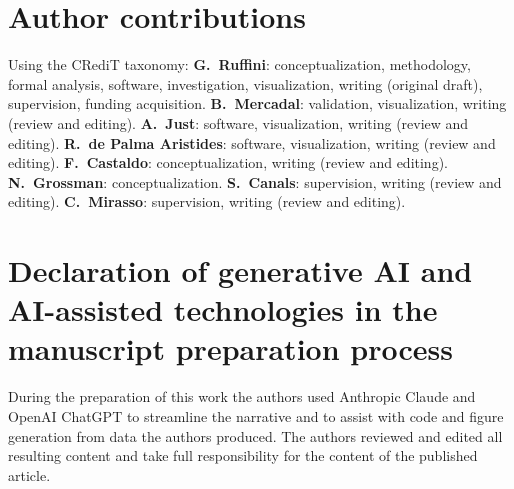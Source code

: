 \documentclass[11pt,a4paper]{article}
\newif\ifappendices
\begin{document}
\section*{Author contributions}
Using the CRediT taxonomy: \textbf{G.~Ruffini}: conceptualization, methodology, formal
analysis, software, investigation, visualization, writing (original draft), supervision,
funding acquisition. \textbf{B.~Mercadal}: validation, visualization, writing (review
and editing). \textbf{A.~Just}: software, visualization, writing (review and editing).
\textbf{R.~de Palma Aristides}: software, visualization, writing (review and editing).
\textbf{F.~Castaldo}: conceptualization, writing (review and editing).
\textbf{N.~Grossman}: conceptualization.
\textbf{S.~Canals}: supervision, writing (review and editing).
\textbf{C.~Mirasso}: supervision, writing (review and editing).
\fi

\section*{Declaration of generative AI and AI-assisted technologies in the manuscript
preparation process}
During the preparation of this work the authors used Anthropic Claude and OpenAI ChatGPT to
streamline the narrative and to assist with code and figure generation from data the authors
produced. The authors reviewed and edited all resulting content and take full responsibility
for the content of the published article.




\fi
\ifappendices
\clearpage
\appendix
\renewcommand{\thefigure}{S\arabic{figure}}
\setcounter{figure}{0}
\makeatletter
\let\ne@stdsection\section
\renewcommand{\section}{\clearpage\ne@stdsection}
\makeatother
\end{document}
